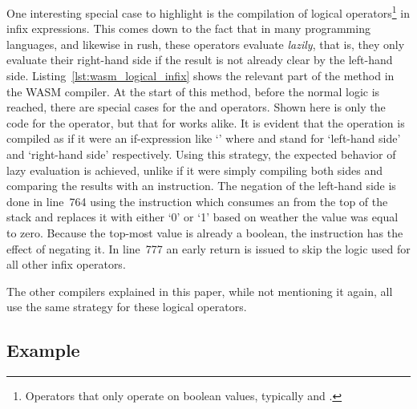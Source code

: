 One interesting special case to highlight is the compilation of logical operators\footnote{Operators that only operate on boolean values, typically \qVerb{&&} and \qVerb{||}.} in infix expressions.
This comes down to the fact that in many programming languages, and likewise in rush, these operators evaluate \emph{lazily}, that is, they only evaluate their right-hand side if the result is not already clear by the left-hand side.
Listing~\ref{lst:wasm_logical_infix} shows the relevant part of the  method in the WASM compiler.
At the start of this method, before the normal logic is reached, there are special cases for the \qVerb{&&} and \qVerb{||} operators.
Shown here is only the code for the \qVerb{&&} operator, but that for \qVerb{||} works alike.
It is evident that the operation is compiled as if it were an if-expression like `' where  and  stand for `left-hand side' and `right-hand side' respectively.
Using this strategy, the expected behavior of lazy evaluation is achieved, unlike if it were simply compiling both sides and comparing the results with an  instruction.
The negation of the left-hand side is done in line~764 using the  instruction which consumes an  from the top of the stack and replaces it with either `0' or `1' based on weather the value was equal to zero.
Because the top-most value is already a boolean, the instruction has the effect of negating it.
In line~777 an early return is issued to skip the logic used for all other infix operators.

The other compilers explained in this paper, while not mentioning it again, all use the same strategy for these logical operators.

\subsection{Example}


